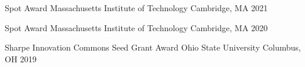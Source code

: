 
\begin{cvhonors}

    \cvhonor
    {Spot Award}
    {Massachusetts Institute of Technology}
    {Cambridge, MA}
    {2021}

\cvhonor   
    {Spot Award}
    {Massachusetts Institute of Technology}
    {Cambridge, MA}
    {2020}
    
\cvhonor   
    {Sharpe Innovation Commons Seed Grant Award}
    {Ohio State University}
    {Columbus, OH}
    {2019}
    
\end{cvhonors}


